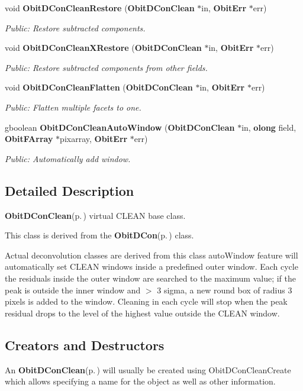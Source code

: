 \begin{CompactItemize}
void {\bf Obit\-DCon\-Clean\-Restore} ({\bf Obit\-DCon\-Clean} $\ast$in, {\bf Obit\-Err} $\ast$err)
\begin{CompactList}\small\item\em Public: Restore subtracted components. \item\end{CompactList}\item 
void {\bf Obit\-DCon\-Clean\-XRestore} ({\bf Obit\-DCon\-Clean} $\ast$in, {\bf Obit\-Err} $\ast$err)
\begin{CompactList}\small\item\em Public: Restore subtracted components from other fields. \item\end{CompactList}\item 
void {\bf Obit\-DCon\-Clean\-Flatten} ({\bf Obit\-DCon\-Clean} $\ast$in, {\bf Obit\-Err} $\ast$err)
\begin{CompactList}\small\item\em Public: Flatten multiple facets to one. \item\end{CompactList}\item 
gboolean {\bf Obit\-DCon\-Clean\-Auto\-Window} ({\bf Obit\-DCon\-Clean} $\ast$in, {\bf olong} field, {\bf Obit\-FArray} $\ast$pixarray, {\bf Obit\-Err} $\ast$err)
\begin{CompactList}\small\item\em Public: Automatically add window. \item\end{CompactList}\end{CompactItemize}


\subsection{Detailed Description}
{\bf Obit\-DCon\-Clean}{\rm (p.\,\pageref{structObitDConClean})} virtual CLEAN base class. 

This class is derived from the {\bf Obit\-DCon}{\rm (p.\,\pageref{structObitDCon})} class.

Actual deconvolution classes are derived from this class auto\-Window feature will automatically set CLEAN windows inside a predefined outer window. Each cycle the residuals inside the outer window are searched to the maximum value; if the peak is outside the inner window and $>$ 3 sigma, a new round box of radius 3 pixels is added to the window. Cleaning in each cycle will stop when the peak residual drops to the level of the highest value outside the CLEAN window.\subsection{Creators and Destructors}\label{ObitDConClean_8h_ObitDConCleanaccess}
An {\bf Obit\-DCon\-Clean}{\rm (p.\,\pageref{structObitDConClean})} will usually be created using Obit\-DCon\-Clean\-Create which allows specifying a name for the object as well as other information.

